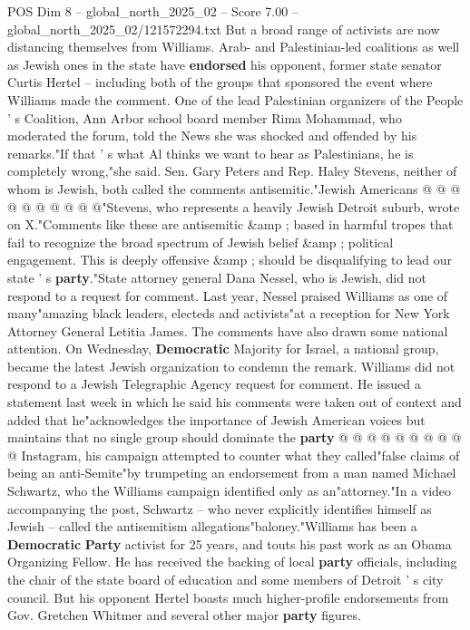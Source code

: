 \begin{textsample}{POS Dim 8 – global\_north\_2025\_02 – Score 7.00 – global\_north\_2025\_02/121572294.txt}
But a broad range of activists are now distancing themselves from Williams.
Arab- and Palestinian-led coalitions as well as Jewish ones in the state have \textbf{endorsed} his opponent, former state senator Curtis Hertel -- including both of the groups that sponsored the event where Williams made the comment.
One of the lead Palestinian organizers of the People ' s Coalition, Ann Arbor school board member Rima Mohammad, who moderated the forum, told the News she was shocked and offended by his remarks."If that ' s what Al thinks we want to hear as Palestinians, he is completely wrong,"she said.
Sen.
Gary Peters and Rep.
Haley Stevens, neither of whom is Jewish, both called the comments antisemitic."Jewish Americans @ @ @ @ @ @ @ @ @ @"Stevens, who represents a heavily Jewish Detroit suburb, wrote on X."Comments like these are antisemitic \&amp ; based in harmful tropes that fail to recognize the broad spectrum of Jewish belief \&amp ; political engagement.
This is deeply offensive \&amp ; should be disqualifying to lead our state ' s \textbf{party}."State attorney general Dana Nessel, who is Jewish, did not respond to a request for comment.
Last year, Nessel praised Williams as one of many"amazing black leaders, electeds and activists"at a reception for New York Attorney General Letitia James.
The comments have also drawn some national attention.
On Wednesday, \textbf{Democratic} Majority for Israel, a national group, became the latest Jewish organization to condemn the remark.
Williams did not respond to a Jewish Telegraphic Agency request for comment.
He issued a statement last week in which he said his comments were taken out of context and added that he"acknowledges the importance of Jewish American voices but maintains that no single group should dominate the \textbf{party} @ @ @ @ @ @ @ @ @ @ Instagram, his campaign attempted to counter what they called"false claims of being an anti-Semite"by trumpeting an endorsement from a man named Michael Schwartz, who the Williams campaign identified only as an"attorney."In a video accompanying the post, Schwartz -- who never explicitly identifies himself as Jewish -- called the antisemitism allegations"baloney."Williams has been a \textbf{Democratic} \textbf{Party} activist for 25 years, and touts his past work as an Obama Organizing Fellow.
He has received the backing of local \textbf{party} officials, including the chair of the state board of education and some members of Detroit ' s city council.
But his opponent Hertel boasts much higher-profile endorsements from Gov.
Gretchen Whitmer and several other major \textbf{party} figures.

\end{textsample}
